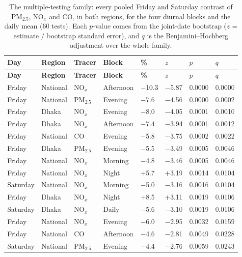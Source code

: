 \begingroup\scriptsize
\begin{longtable}{L{1.5cm} L{1.4cm} L{1.1cm} L{1.6cm} C{1.3cm} C{1.3cm} C{1.4cm} C{1.4cm}}
\caption{The multiple-testing family: every pooled Friday and Saturday contrast of PM$_{2.5}$, NO$_x$ and CO, in both regions, for the four diurnal blocks and the daily mean (60 tests). Each $p$-value comes from the joint-date bootstrap ($z$ = estimate / bootstrap standard error), and $q$ is the Benjamini--Hochberg adjustment over the whole family.}\label{tab:s-bh}\\
\toprule
\textbf{Day} & \textbf{Region} & \textbf{Tracer} & \textbf{Block} & \textbf{\%} & \textbf{$z$} & \textbf{$p$} & \textbf{$q$} \\
\midrule\endfirsthead
\toprule
\textbf{Day} & \textbf{Region} & \textbf{Tracer} & \textbf{Block} & \textbf{\%} & \textbf{$z$} & \textbf{$p$} & \textbf{$q$} \\
\midrule\endhead
\bottomrule\endfoot
Friday & National & NO$_x$ & Afternoon & $-$10.3 & $-$5.87 & 0.0000 & 0.0000 \\
Friday & National & PM$_{2.5}$ & Evening & $-$7.6 & $-$4.56 & 0.0000 & 0.0002 \\
Friday & Dhaka & NO$_x$ & Evening & $-$8.0 & $-$4.05 & 0.0001 & 0.0010 \\
Friday & Dhaka & NO$_x$ & Afternoon & $-$7.4 & $-$3.94 & 0.0001 & 0.0012 \\
Friday & National & CO & Evening & $-$5.8 & $-$3.75 & 0.0002 & 0.0022 \\
Friday & Dhaka & PM$_{2.5}$ & Evening & $-$5.5 & $-$3.49 & 0.0005 & 0.0046 \\
Friday & National & NO$_x$ & Morning & $-$4.8 & $-$3.46 & 0.0005 & 0.0046 \\
Friday & National & NO$_x$ & Night & $+$5.7 & $+$3.19 & 0.0014 & 0.0104 \\
Saturday & National & NO$_x$ & Morning & $-$5.0 & $-$3.16 & 0.0016 & 0.0104 \\
Friday & Dhaka & NO$_x$ & Night & $+$8.5 & $+$3.11 & 0.0019 & 0.0106 \\
Saturday & Dhaka & NO$_x$ & Daily & $-$5.6 & $-$3.10 & 0.0019 & 0.0106 \\
Friday & National & NO$_x$ & Evening & $-$6.0 & $-$2.95 & 0.0032 & 0.0159 \\
Friday & National & CO & Afternoon & $-$4.6 & $-$2.81 & 0.0049 & 0.0228 \\
Saturday & National & PM$_{2.5}$ & Evening & $-$4.4 & $-$2.76 & 0.0059 & 0.0243 \\

\end{longtable}
